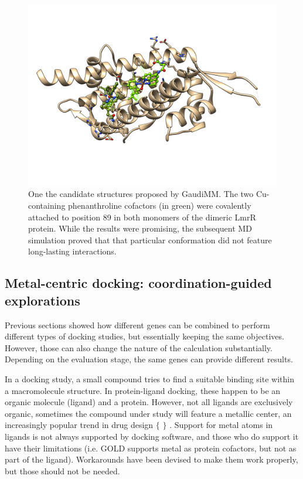 \begin{figure}[H] %
	\begin{Center}
		\includegraphics[width=\textwidth]{./figures/06/dual_phn.png}
	\end{Center}
	\caption[Proposed Cu-containing phenanthroline cofactors]{One the candidate structures proposed by GaudiMM. The two Cu-containing phenanthroline cofactors (in green) were covalently attached to position 89 in both monomers of the dimeric LmrR protein. While the results were promising, the subsequent MD simulation proved that that particular conformation did not feature long-lasting interactions.}
	\label{fig:phenanthroline}
\end{figure}


\subsection{Metal-centric docking: coordination-guided explorations}
Previous sections showed how different genes can be combined to perform different types of docking studies, but essentially keeping the same objectives. However, those can also change the nature of the calculation substantially. Depending on the evaluation stage, the same genes can provide different results.

In a docking study, a small compound tries to find a suitable binding site within a macromolecule structure. In protein-ligand docking, these happen to be an organic molecule (ligand) and a protein. However, not all ligands are exclusively organic, sometimes the compound under study will feature a metallic center, an increasingly popular trend in drug design $ \{ $ $ \} $ . Support for metal atoms in ligands is not always supported by docking software, and those who do support it have their limitations (i.e. GOLD supports metal as protein cofactors, but not as part of the ligand). Workarounds have been devised to make them work properly,\cite{hbondtrick} but those should not be needed.

